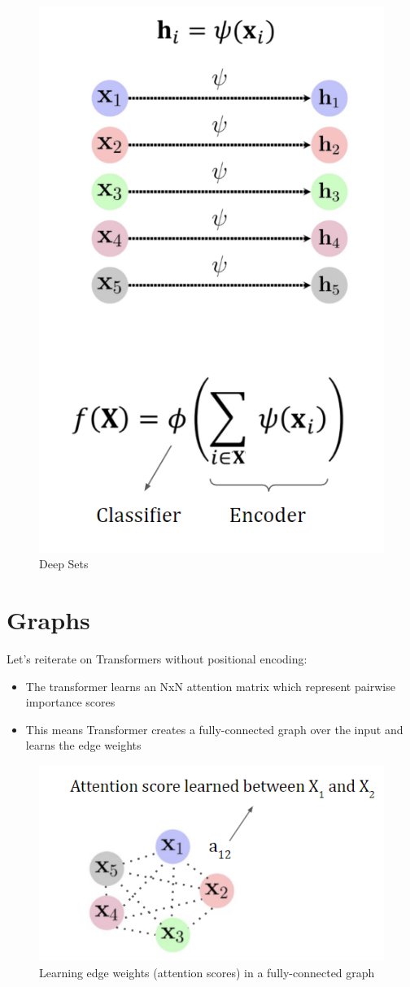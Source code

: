 \begin{figure}[h!t]
    \centering
    \includegraphics[width=0.275\linewidth]{deepsets.png}
    \caption{Deep Sets}
    \label{fig:enter-label}
\end{figure}

\newpage

\section{Graphs}

Let’s reiterate on Transformers without positional encoding:
\begin{itemize}
    \item The transformer learns an NxN attention matrix which represent pairwise importance scores
    \item This means Transformer creates a fully-connected graph over the input and learns the edge weights
\end{itemize}

\begin{figure}[h!t]
    \centering
    \includegraphics[width=0.75\linewidth]{edgeweights.png}
    \caption{Learning edge weights (attention scores) in a fully-connected graph}
    \label{fig:enter-label}
\end{figure}

